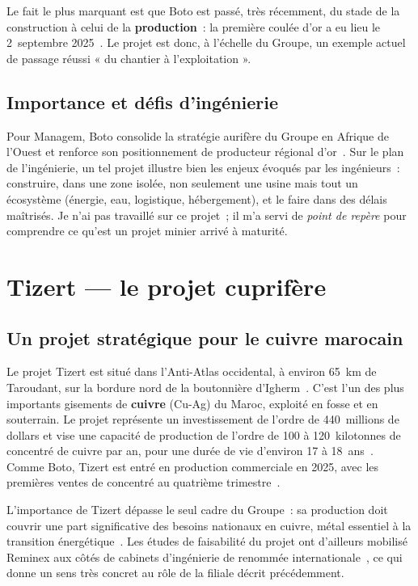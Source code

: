 Le fait le plus marquant est que Boto est passé, très récemment, du stade de la construction à celui de la \textbf{production}~: la première coulée d'or a eu lieu le 2~septembre 2025~\cite{managem_boto}. Le projet est donc, à l'échelle du Groupe, un exemple actuel de passage réussi « du chantier à l'exploitation ».

\subsection{Importance et défis d'ingénierie}

Pour Managem, Boto consolide la stratégie aurifère du Groupe en Afrique de l'Ouest et renforce son positionnement de producteur régional d'or~\cite{allafrica_boto}. Sur le plan de l'ingénierie, un tel projet illustre bien les enjeux évoqués par les ingénieurs~: construire, dans une zone isolée, non seulement une usine mais tout un écosystème (énergie, eau, logistique, hébergement), et le faire dans des délais maîtrisés. Je n'ai pas travaillé sur ce projet~; il m'a servi de \emph{point de repère} pour comprendre ce qu'est un projet minier arrivé à maturité.

\section{Tizert --- le projet cuprifère}

\subsection{Un projet stratégique pour le cuivre marocain}

Le projet Tizert est situé dans l'Anti-Atlas occidental, à environ 65~km de Taroudant, sur la bordure nord de la boutonnière d'Igherm~\cite{managem_tizert}. C'est l'un des plus importants gisements de \textbf{cuivre} (Cu-Ag) du Maroc, exploité en fosse et en souterrain. Le projet représente un investissement de l'ordre de 440~millions de dollars et vise une capacité de production de l'ordre de 100 à 120~kilotonnes de concentré de cuivre par an, pour une durée de vie d'environ 17 à 18~ans~\cite{managem_tizert}. Comme Boto, Tizert est entré en production commerciale en 2025, avec les premières ventes de concentré au quatrième trimestre~\cite{managem_tizert}.

L'importance de Tizert dépasse le seul cadre du Groupe~: sa production doit couvrir une part significative des besoins nationaux en cuivre, métal essentiel à la transition énergétique~\cite{managem_tizert}. Les études de faisabilité du projet ont d'ailleurs mobilisé Reminex aux côtés de cabinets d'ingénierie de renommée internationale~\cite{managem_tizert}, ce qui donne un sens très concret au rôle de la filiale décrit précédemment.


